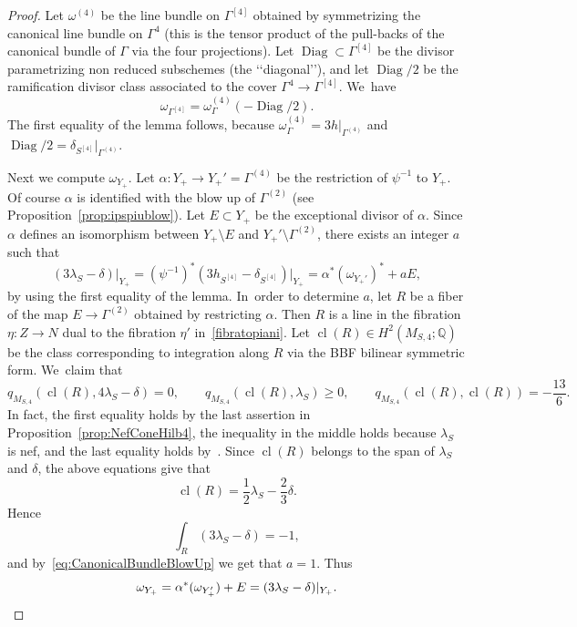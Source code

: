 \documentclass[11pt]{article}
\newcommand{\QQ}{{\mathbb Q}}\let\Q\QQ
\DeclareMathOperator{\cl}{cl}
\DeclareMathOperator{\Diag}{Diag}
\theoremstyle{definition}
\begin{document}
\begin{proof}
Let $\omega^{(4)}$ be the line bundle on $\mathsf{\Gamma}^{[4]}$ obtained by symmetrizing the canonical line bundle on $\mathsf{\Gamma}^4$ (this is the tensor product of the pull-backs of the canonical bundle of $\mathsf{\Gamma}$ via the four projections). Let $\Diag\subset \mathsf{\Gamma}^{[4]}$ be the divisor parametrizing non reduced subschemes (the \lq\lq diagonal\rq\rq), and let $\Diag/2$ be the ramification divisor class associated to the cover $\mathsf{\Gamma}^4\to \mathsf{\Gamma}^{[4]}$. We~have
\[
\omega_{\mathsf{\Gamma}^{[4]}}=\omega^{(4)}_{\mathsf{\Gamma}}(-\Diag/2).
\]
The first equality of the lemma follows, because $\omega^{(4)}_{\mathsf{\Gamma}}=3 h \vert_{\mathsf{\Gamma}^{(4)}}$ and $\Diag/2=\delta_{S^{[4]}}\vert_{\mathsf{\Gamma}^{(4)}}$.

Next we compute $\omega_{Y_+}$. Let $\alpha\colon Y_{+}\to Y_{+}'=\mathsf{\Gamma}^{(4)}$ be the restriction of $\psi^{-1}$ to $Y_{+}$. Of course $\alpha$ is identified with the blow up of $\mathsf{\Gamma}^{(2)}$ (see Proposition~\ref{prop:ipspiublow}).
Let $E\subset Y_+$ be the exceptional divisor of $\alpha$.
Since $\alpha$ defines an isomorphism between $Y_{+}\setminus E$ and $Y_{+}'\setminus \mathsf{\Gamma}^{(2)}$, there exists an integer $a$ such that
\begin{equation}\label{eq:CanonicalBundleBlowUp}
(3 \lambda_S - \delta)\vert_{Y_+} = (\psi^{-1})^{*}(3 h_{S^{[4]}} - \delta_{S^{[4]}})\vert_{Y_+} = \alpha^{*}(\omega_{Y_{+}'})^*+ a E,
\end{equation}
by using the first equality of the lemma. In~order to determine $a$, let $R$ be a fiber of the map $E\to \mathsf{\Gamma}^{(2)}$ obtained by restricting $\alpha$. Then $R$ is a line in the fibration $\eta\colon Z\to N$ dual to the fibration $\eta'$ in~\eqref{fibratopiani}. Let $\cl(R)\in H^2(M_{S,4};\QQ)$ be the class corresponding to integration along $R$ via the BBF bilinear symmetric form. We~claim that
\begin{equation*}
q_{M_{S,4}}\left(\cl(R),4\lambda_S-\delta\right)=0,\qquad
q_{M_{S,4}}\left(\cl(R),\lambda_S\right)\ge 0,\qquad
q_{M_{S,4}}\left(\cl(R),\cl(R)\right)=-\frac{13}{6}.
\end{equation*}
In fact, the first equality holds by the last assertion in
Proposition~\ref{prop:NefConeHilb4}, the inequality in the middle holds because $\lambda_S$ is nef, and the last equality holds by~\cite[Table\,H4]{HT:IntersectionNumbers}.
Since $\cl(R)$ belongs to the span of $\lambda_S$ and $\delta$, the above equations give that
\[
\cl(R) = \frac 12 \lambda_S - \frac 23 \delta.
\]
Hence
\[
\int_R(3\lambda_S - \delta) = -1,
\]
and by~\eqref{eq:CanonicalBundleBlowUp} we get that $a=1$. Thus
\[
\omega_{Y_+} = \alpha^*(\omega_{Y_+'}) + E = (3 \lambda_S - \delta)\vert_{Y_+}.\qedhere
\]
\end{proof}
\end{document}
